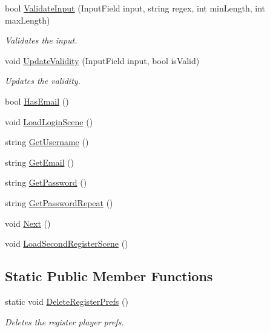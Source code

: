\begin{DoxyCompactItemize}
bool \hyperlink{classRegisterSceneController_aca29000f3de2f31a41a420a9c4c1639b}{Validate\+Input} (Input\+Field input, string regex, int min\+Length, int max\+Length)
\begin{DoxyCompactList}\small\item\em Validates the input. \end{DoxyCompactList}\item 
void \hyperlink{classRegisterSceneController_aa7d1efd7bd7be513fbba6a248e115e8b}{Update\+Validity} (Input\+Field input, bool is\+Valid)
\begin{DoxyCompactList}\small\item\em Updates the validity. \end{DoxyCompactList}\item 
bool \hyperlink{classRegisterSceneController_a98caf58a3c2c691304a397aee86c5344}{Has\+Email} ()
\item 
void \hyperlink{classRegisterSceneController_aacefa2b50cf97ef1b598341fdd03b5f5}{Load\+Login\+Scene} ()
\item 
string \hyperlink{classRegisterSceneController_a3cf7888cc3ffee9b18f8ed9c7aac7234}{Get\+Username} ()
\item 
string \hyperlink{classRegisterSceneController_a6a16162669f6e291bddb586f1b6027da}{Get\+Email} ()
\item 
string \hyperlink{classRegisterSceneController_a5dccef6b11a29509945aa82dc97f7e4b}{Get\+Password} ()
\item 
string \hyperlink{classRegisterSceneController_a26bf1ef1a810b7b7841c50044f1c7d95}{Get\+Password\+Repeat} ()
\item 
void \hyperlink{classRegisterSceneController_afcd9e91a3c6b0a25ce098b1b6b423ca9}{Next} ()
\item 
void \hyperlink{classRegisterSceneController_a612f117976627191de166236562ce2e9}{Load\+Second\+Register\+Scene} ()
\end{DoxyCompactItemize}
\subsection*{Static Public Member Functions}
\begin{DoxyCompactItemize}
\item 
static void \hyperlink{classRegisterSceneController_abf0f6592a409a6bf706640b5eb482544}{Delete\+Register\+Prefs} ()
\begin{DoxyCompactList}\small\item\em Deletes the register player prefs. \end{DoxyCompactList}\end{DoxyCompactItemize}
